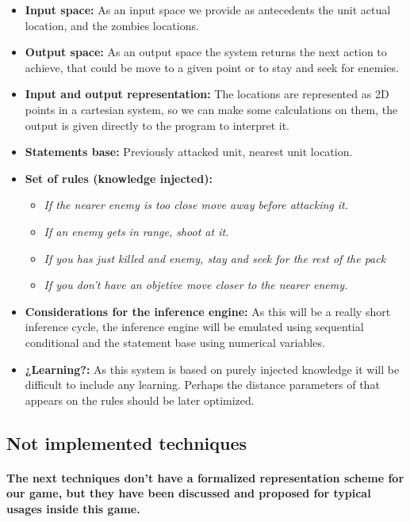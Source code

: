 \documentclass[a4paper,10pt]{article}
\newcommand{\p}[1]{\paragraph{\indent\textnormal{#1}}}
\begin{document}
      \begin{itemize}
      \item \textbf{Input space:} As an input space we provide as antecedents the unit actual location, and the zombies locations.
      \item \textbf{Output space:} As an output space the system returns the next action to achieve, that could be move to a given point or to stay and seek for enemies.
      \item \textbf{Input and output representation:} The locations are represented as 2D points in a cartesian system, so we can make some calculations on them, the output is given directly to the program to interpret it.
      \item \textbf{Statements base:} Previously attacked unit, nearest unit location.
      \item \textbf{Set of rules (knowledge injected):}
	  \begin{itemize}
	    \item \textit{If the nearer enemy is too close move away before attacking it.}
	    \item \textit{If an enemy gets in range, shoot at it.}
	    \item \textit{If you has just killed and enemy, stay and seek for the rest of the pack}
	    \item \textit{If you don't have an objetive move closer to the nearer enemy.}

	  \end{itemize}
      \item \textbf{Considerations for the inference engine:} As this will be a really short inference cycle, the inference engine will be emulated using sequential conditional and the statement base using numerical variables.
      \item \textbf{¿Learning?:} As this system is based on purely injected knowledge it will be difficult to include any learning. Perhaps the distance parameters of that appears on the rules should be later optimized.
      \end{itemize}


\subsection{Not implemented techniques}

    \p{The next techniques don't have a formalized representation scheme for our game, but they have been discussed and proposed for typical usages inside this game.}
\end{document}
